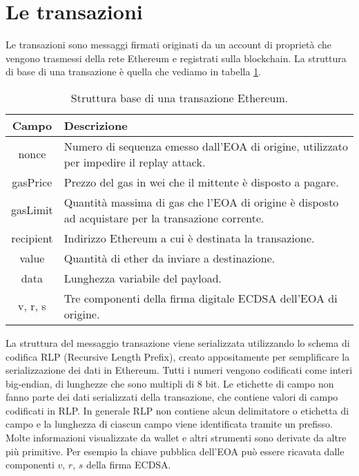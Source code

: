 \section{Le transazioni}
Le transazioni sono messaggi firmati originati da un account di proprietà che vengono trasmessi della rete Ethereum e registrati sulla blockchain. La struttura di base di una transazione è quella che vediamo in tabella \ref{tab:struttura_base_transazioni}.
%
\begin{table}[]
	\centering
	\begin{tabular}{|c|p{11cm}|}
		\hline
		\textbf{Campo} & \textbf{Descrizione} \\ \hline
		nonce & Numero di sequenza emesso dall'EOA di origine, utilizzato per impedire il replay attack.\\ \hline
		gasPrice & Prezzo del gas in wei che il mittente è disposto a pagare.\\ \hline
		gasLimit & Quantità massima di gas che l'EOA di origine è disposto ad acquistare per la transazione corrente.\\ \hline
		recipient & Indirizzo Ethereum a cui è destinata la transazione. \\ \hline
		value & Quantità di ether da inviare a destinazione.\\ \hline
		data & Lunghezza variabile del payload.\\ \hline
		v, r, s & Tre componenti della firma digitale ECDSA dell'EOA di origine.\\ \hline
	\end{tabular}
	\caption{Struttura base di una transazione Ethereum.}
	\label{tab:struttura_base_transazioni}
\end{table}
%
La struttura del messaggio transazione viene serializzata utilizzando lo schema di codifica RLP (Recursive Length Prefix), creato appositamente per semplificare la serializzazione dei dati in Ethereum. Tutti i numeri vengono codificati come interi big-endian, di lunghezze che sono multipli di 8 bit. Le etichette di campo non fanno parte dei dati serializzati della transazione, che contiene valori di campo codificati in RLP. In generale RLP non contiene alcun delimitatore o etichetta di campo e la lunghezza di ciascun campo viene identificata tramite un prefisso. Molte informazioni visualizzate da wallet e altri strumenti sono derivate da altre più primitive. Per esempio la chiave pubblica dell'EOA può essere ricavata dalle componenti $v$, $r$, $s$ della firma ECDSA.

